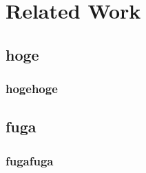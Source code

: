 \chapter{Related Work}\label{ch:related-work}
\section{hoge}
\subsection{hogehoge}
\section{fuga}
\subsection{fugafuga}